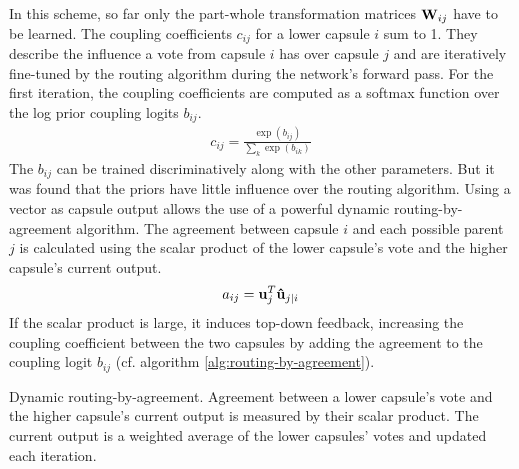 In this scheme, so far only the part-whole transformation matrices $\vb{W}_{ij}$ have to be learned. The coupling coefficients $c_{ij}$ for a lower capsule $i$ sum to 1. They describe the influence a vote from capsule $i$ has over capsule $j$ and are iteratively fine-tuned by the routing algorithm during the network's forward pass. For the first iteration, the coupling coefficients are computed as a softmax function over the log prior coupling logits $b_{ij}$.
\begin{align}
    c_{ij} = \frac{\exp(b_{ij})}{\sum_k \exp(b_{ik})}
    \label{eq:coupling-coeff}
\end{align}
The $b_{ij}$ can be trained discriminatively along with the other parameters. But it was found that the priors have little influence over the routing algorithm.
Using a vector as capsule output allows the use of a powerful dynamic routing-by-agreement algorithm. The agreement between capsule $i$ and each possible parent $j$ is calculated using the scalar product of the lower capsule's vote and the higher capsule's current output.
\begin{align}
    a_{ij} = \vb{u}_j^T \vb{\hat{u}}_{j|i}
\end{align}
If the scalar product is large, it induces top-down feedback, increasing the coupling coefficient between the two capsules by adding the agreement to the coupling logit $b_{ij}$ (cf. algorithm \ref{alg:routing-by-agreement}).
\begin{algorithm}[H]
\caption[Dynamic routing-by-agreement]{Dynamic routing-by-agreement. Agreement between a lower capsule's vote and the higher capsule's current output is measured by their scalar product. The current output is a weighted average of the lower capsules' votes and updated each iteration.}\label{alg:routing-by-agreement}
\begin{algorithmic}[1]
  \EndFor
\EndFor
{}
  \EndFor
  \EndFor
    \EndFor
  \EndFor
\EndFor
\State{}
\EndProcedure
\end{algorithmic}
\end{algorithm}
